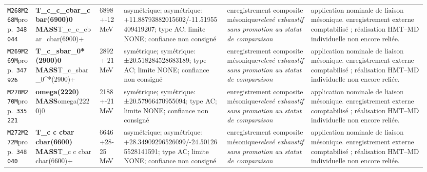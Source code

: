 \begin{landscape}
\begin{longtable}{L{1.85cm}L{4.45cm}L{2.35cm}L{4.05cm}L{3.35cm}L{7.15cm}}
\texttt{M268}\newline \texttt{M268M}\newline prop.\ \texttt{348044} & \textbf{T\_\allowbreak{}c\_\allowbreak{}c\_\allowbreak{}cbar\_\allowbreak{}cbar(6900)0 MASS}\newline T\_\allowbreak{}c\_\allowbreak{}c\_\allowbreak{}cbar\_\allowbreak{}cbar(6900)+ & 6898+-12\,MeV & asymétrique; asymétrique: +11.88793882015602/-11.51955409419207; type AC; limite NONE; confiance non consigné & enregistrement composite mésonique\newline \emph{relevé exhaustif sans promotion au statut de comparaison} & application nominale de liaison mésonique. enregistrement externe comptabilisé ; réalisation HMT--MD individuelle non encore reliée. \\
\texttt{M269}\newline \texttt{M269M}\newline prop.\ \texttt{347926} & \textbf{T\_\allowbreak{}c\_\allowbreak{}sbar\_\allowbreak{}0*(2900)0 MASS}\newline T\_\allowbreak{}c\_\allowbreak{}sbar\_\allowbreak{}0\textasciicircum{}*(2900)+ & 2892+-21\,MeV & symétrique; symétrique: ±20.518284528683189; type AC; limite NONE; confiance non consigné & enregistrement composite mésonique\newline \emph{relevé exhaustif sans promotion au statut de comparaison} & application nominale de liaison mésonique. enregistrement externe comptabilisé ; réalisation HMT--MD individuelle non encore reliée. \\
\texttt{M270}\newline \texttt{M270M}\newline prop.\ \texttt{335221} & \textbf{omega(2220) MASS}\newline omega(2220)0 & 2188+-21\,MeV & symétrique; symétrique: ±20.57966470955094; type AC; limite NONE; confiance non consigné & enregistrement composite mésonique\newline \emph{relevé exhaustif sans promotion au statut de comparaison} & application nominale de liaison mésonique. enregistrement externe comptabilisé ; réalisation HMT--MD individuelle non encore reliée. \\
\texttt{M272}\newline \texttt{M272M}\newline prop.\ \texttt{348040} & \textbf{T\_\allowbreak{}c c cbar cbar(6600) MASS}\newline T\_\allowbreak{}c c cbar cbar(6600)+ & 6646+28-25\,MeV & asymétrique; asymétrique: +28.34909296526099/-24.501265528141591; type AC; limite NONE; confiance non consigné & enregistrement composite mésonique\newline \emph{relevé exhaustif sans promotion au statut de comparaison} & application nominale de liaison mésonique. enregistrement externe comptabilisé ; réalisation HMT--MD individuelle non encore reliée. \\

\end{longtable}
\end{landscape}
